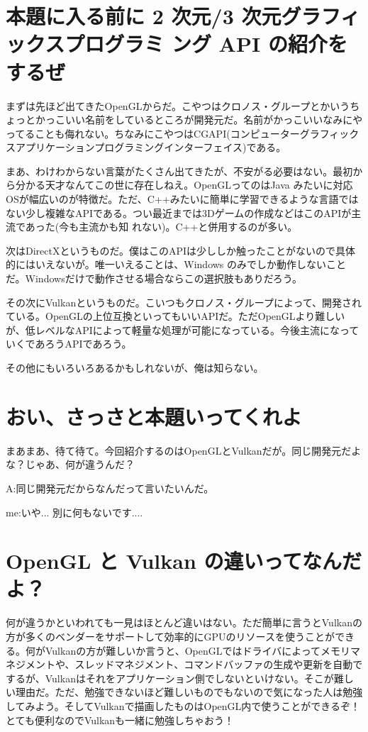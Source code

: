 \documentclass[12pt,a4paper,titlepage]{jsarticle}
\begin{document}
\section{本題に入る前に 2 次元/3 次元グラフィックスプログラミ ング API の紹介をするぜ}
まずは先ほど出てきたOpenGLからだ。こやつはクロノス・グループとかいうちょっとかっこいい名前をしているところが開発元だ。名前がかっこいいなみにやってることも侮れない。ちなみにこやつはCGAPI(コンピューターグラフィックスアプリケーションプログラミングインターフェイス)である。 

まあ、わけわからない言葉がたくさん出てきたが、不安がる必要はない。最初から分かる天才なんてこの世に存在しねえ。OpenGLってのはJava みたいに対応OSが幅広いのが特徴だ。ただ、C++みたいに簡単に学習できるような言語ではない少し複雑なAPIである。つい最近までは3Dゲームの作成などはこのAPIが主流であった(今も主流かも知 れない)。C++と併用するのが多い。 

次はDirectXというものだ。僕はこのAPIは少ししか触ったことがないので具体的にはいえないが。唯一いえることは、Windows のみでしか動作しないことだ。Windowsだけで動作させる場合ならこの選択肢もありだろう。 

その次にVulkanというものだ。こいつもクロノス・グループによって、開発されている。OpenGLの上位互換といってもいいAPIだ。ただOpenGLより難しいが、低レベルなAPIによって軽量な処理が可能になっている。今後主流になっていくであろうAPIであろう。 

その他にもいろいろあるかもしれないが、俺は知らない。

\section{おい、さっさと本題いってくれよ}
まあまあ、待て待て。今回紹介するのはOpenGLとVulkanだが。同じ開発元だよな？じゃあ、何が違うんだ？

 A:同じ開発元だからなんだって言いたいんだ。
 
 me:いや... 別に何もないです....
 
\section{OpenGL と Vulkan の違いってなんだよ？}
何が違うかといわれても一見はほとんど違いはない。ただ簡単に言うとVulkanの方が多くのベンダーをサポートして効率的にGPUのリソースを使うことができる。何がVulkanの方が難しいか言うと、OpenGLではドライバによってメモリマネジメントや、スレッドマネジメント、コマンドバッファの生成や更新を自動でするが、Vulkanはそれをアプリケーション側でしないといけない。そこが難しい理由だ。ただ、勉強できないほど難しいものでもないので気になった人は勉強してみよう。そしてVulkanで描画したものはOpenGL内で使うことができるぞ！とても便利なのでVulkanも一緒に勉強しちゃおう！
\end{document}
